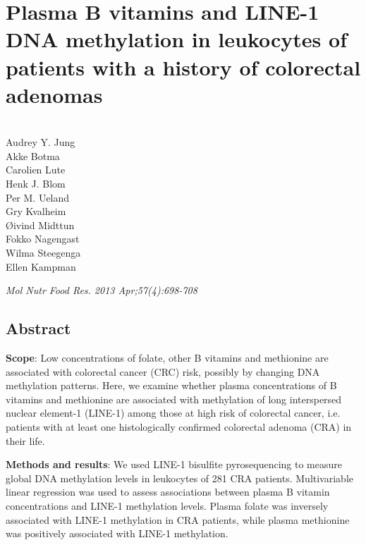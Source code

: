 \chapter{Plasma B vitamins and LINE-1 DNA methylation in leukocytes of patients  with a history of colorectal adenomas}
\label{chap5_poliep} 

\quad\\
\noindent
Audrey Y. Jung\\
Akke Botma\\
Carolien Lute\\
Henk J. Blom\\
Per M. Ueland\\
Gry Kvalheim\\
{\O}ivind Midttun\\
Fokko Nagengast\\
Wilma Steegenga\\
Ellen Kampman\\

\begin{table}[b]
\emph{Mol Nutr Food Res. 2013 Apr;57(4):698-708}
\end{table}

\newpage 
 

\section*{Abstract}
\noindent \textbf{Scope}: Low concentrations of folate, other B vitamins and methionine are associated with colorectal cancer (CRC) risk, possibly by changing DNA methylation patterns. Here, we examine whether plasma concentrations of B vitamins and methionine are associated with methylation of long interspersed nuclear element-1 (LINE-1) among those at high risk of colorectal cancer, i.e. patients with at least one histologically confirmed colorectal adenoma (CRA) in their life.

\noindent \textbf{Methods and results}: We used LINE-1 bisulfite pyrosequencing to measure global DNA methylation levels in leukocytes of 281 CRA patients. Multivariable linear regression was used to assess associations between plasma B vitamin concentrations and LINE-1 methylation levels. Plasma folate was inversely associated with LINE-1 methylation in CRA patients, while plasma methionine was positively associated with LINE-1 methylation.

